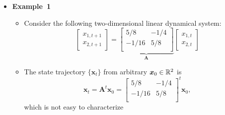 \documentclass[12pt,a4paper]{article}
\begin{document}
\begin{itemize}

\item \textbf{Example~1}
  \begin{itemize}
  \item Consider the following two-dimensional linear dynamical system:
    \begin{equation}\nonumber%
      \begin{bmatrix}
        x_{1,t+1} \\
        x_{2,t+1}
      \end{bmatrix}
      =
      \underbrace{
      \begin{bmatrix}
        5/8 & -1/4 \\
        -1/16 & 5/8 \\
      \end{bmatrix}%
      }_{\bm{A}}
      \begin{bmatrix}
        x_{1,t} \\
        x_{2,t}
      \end{bmatrix}
    \end{equation}
    \item The state trajectory $\{\bm{x}_{t}\}$ from arbitrary $\bm{x}_{0}\in \mathbb{R}^{2}$ is
      \begin{equation}\nonumber%
        \bm{x}_{t}
        =
        \bm{A}^{t}\bm{x}_{0}
        =
      \begin{bmatrix}
        5/8 & -1/4 \\
        -1/16 & 5/8 \\
      \end{bmatrix}^{t}
      \bm{x}_{0},
    \end{equation}
    which is not easy to characterize


\end{itemize}
\end{itemize}
\end{document}
